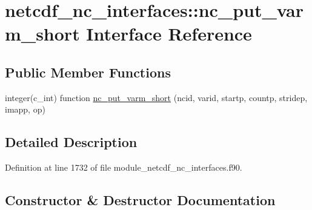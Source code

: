 \hypertarget{interfacenetcdf__nc__interfaces_1_1nc__put__varm__short}{}\section{netcdf\+\_\+nc\+\_\+interfaces\+:\+:nc\+\_\+put\+\_\+varm\+\_\+short Interface Reference}
\label{interfacenetcdf__nc__interfaces_1_1nc__put__varm__short}
\subsection*{Public Member Functions}
\begin{DoxyCompactItemize}
\item 
integer(c\+\_\+int) function \hyperlink{interfacenetcdf__nc__interfaces_1_1nc__put__varm__short_a80a96808ac90884a6136f32bb307aa21}{nc\+\_\+put\+\_\+varm\+\_\+short} (ncid, varid, startp, countp, stridep, imapp, op)
\end{DoxyCompactItemize}


\subsection{Detailed Description}


Definition at line 1732 of file module\+\_\+netcdf\+\_\+nc\+\_\+interfaces.\+f90.



\subsection{Constructor \& Destructor Documentation}
\mbox{\label{interfacenetcdf__nc__interfaces_1_1nc__put__varm__short_a80a96808ac90884a6136f32bb307aa21}} 

